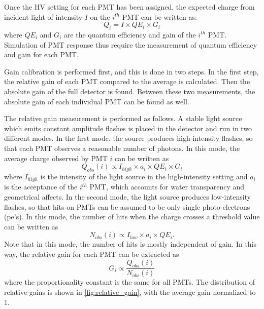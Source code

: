 Once the HV setting for each PMT has been assigned, the expected charge from incident light of intensity $I$ on the $i^{th}$ PMT can be written as:
\begin{equation}
Q_i=I \times QE_i \times G_i
\label{eq:expected_charge}
\end{equation}
where $QE_i$ and $G_i$ are the quantum efficiency and gain of the $i^{th}$ PMT.  Simulation of PMT response thus require the measurement of quantum efficiency and gain for each PMT.  \par
Gain calibration is performed first, and this is done in two steps.  In the first step, the relative gain of each PMT compared to the average is calculated.  Then the absolute gain of the full detector is found.  Between these two measurements, the absolute gain of each individual PMT can be found as well.  \par
The relative gain measurement is performed as follows.  A stable light source which emits constant amplitude flashes is placed in the detector and run in two different modes.  In the first mode, the source produces high-intensity flashes, so that each PMT observes a reasonable number of photons.  In this mode, the average charge observed by PMT $i$ can be written as 
\begin{equation}
Q_{obs}(i) \propto I_{high} \times a_i \times QE_i \times G_i
\end{equation}  
where $I_{high}$ is the intensity of the light source in the high-intensity setting and $a_i$ is the acceptance of the $i^{th}$ PMT, which accounts for water transparency and geometrical affects.  In the second mode, the light source produces low-intensity flashes, so that hits on PMTs can be assumed to be only single photo-electrons (pe's).  In this mode, the number of hits when the charge crosses a threshold value can be written as 
\begin{equation}
N_{obs}(i)\propto I_{low} \times a_i \times QE_i.
\end{equation}
Note that in this mode, the number of hits is mostly independent of gain.  In this way, the relative gain for each PMT can be extracted as 
\begin{equation}
G_i \propto \frac{Q_{obs}(i)}{N_{obs}(i)}
\end{equation}
where the proportionality constant is the same for all PMTs.  The distribution of relative gains is shown in \cref{fig:relative_gain}, with the average gain normalized to 1.\par
